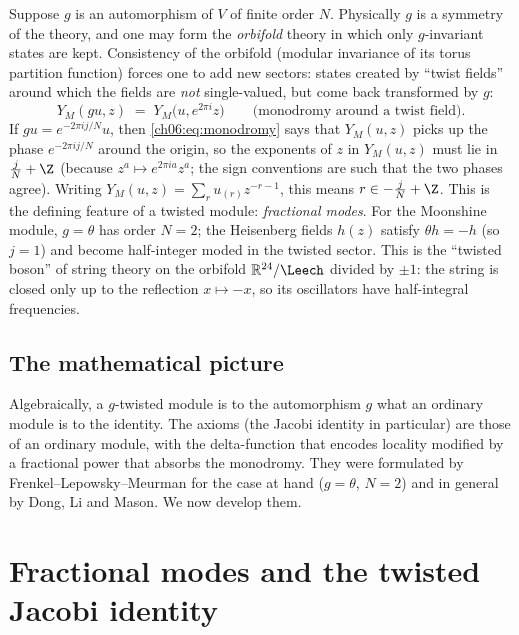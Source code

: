 Suppose $g$ is an automorphism of $V$ of finite order $N$.  Physically $g$ is a symmetry of the
theory, and one may form the \emph{orbifold} theory in which only $g$-invariant states are kept.
Consistency of the orbifold (modular invariance of its torus partition function) forces one to
add new sectors: states created by ``twist fields'' around which the fields are \emph{not}
single-valued, but come back transformed by $g$:
\begin{equation}\label{ch06:eq:monodromy}
  Y_M(g u, z) \;=\; Y_M\bigl(u, e^{2\pi i} z\bigr)\qquad\text{(monodromy around a twist field).}
\end{equation}
If $g u = e^{-2\pi i j/N}u$, then \eqref{ch06:eq:monodromy} says that $Y_M(u,z)$ picks up the
phase $e^{-2\pi i j/N}$ around the origin, so the exponents of $z$ in $Y_M(u,z)$ must lie in
$\tfrac{j}{N}+\Z$ (because $z^{a}\mapsto e^{2\pi i a}z^a$; the sign conventions are such that the
two phases agree).  Writing $Y_M(u,z)=\sum_r u_{(r)}z^{-r-1}$, this means $r\in -\tfrac jN+\Z$.
This is the defining feature of a twisted module: \emph{fractional modes}.  For the Moonshine
module, $g=\theta$ has order $N=2$; the Heisenberg fields $h(z)$ satisfy $\theta h=-h$ (so $j=1$)
and become half-integer moded in the twisted sector.  This is the ``twisted boson'' of string
theory on the orbifold $\mathbb R^{24}/\Leech$ divided by $\pm1$: the string is closed only up to
the reflection $x\mapsto -x$, so its oscillators have half-integral frequencies.

\subsection{The mathematical picture}

Algebraically, a $g$-twisted module is to the automorphism $g$ what an ordinary module is to the
identity.  The axioms (the Jacobi identity in particular) are those of an ordinary module, with the
delta-function that encodes locality modified by a fractional power that absorbs the monodromy.
They were formulated by Frenkel--Lepowsky--Meurman for the case at hand ($g=\theta$, $N=2$) and in
general by Dong, Li and Mason.  We now develop them.

\section{Fractional modes and the twisted Jacobi identity}\label{ch06:sec:dlm}

